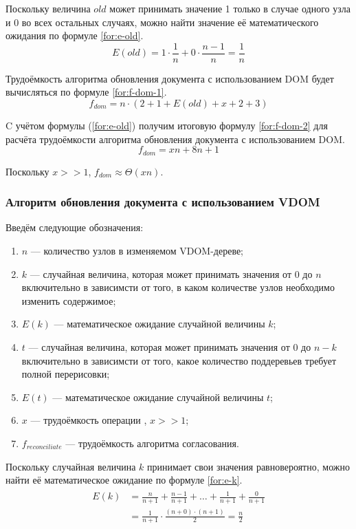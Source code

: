 Поскольку величина $old$ может принимать значение 1 только в случае одного узла и 0 во всех остальных случаях, можно найти значение её математического ожидания по формуле \ref{for:e-old}.
\begin{equation}
	\label{for:e-old}
	E(old) = 1 \cdot \frac{1}{n} + 0 \cdot \frac{n - 1}{n} = \frac{1}{n}
\end{equation}

Трудоёмкость алгоритма обновления документа с использованием DOM будет вычисляться по формуле \ref{for:f-dom-1}.
\begin{equation}
	\label{for:f-dom-1}
	f_{dom} = n \cdot (2 + 1 + E(old) + x + 2 + 3)
\end{equation}

C учётом формулы (\ref{for:e-old}) получим итоговую формулу \ref{for:f-dom-2} для расчёта трудоёмкости алгоритма обновления документа с использованием DOM.
\begin{equation}
	\label{for:f-dom-2}
	f_{dom} = xn + 8n + 1
\end{equation}

Поскольку $x >> 1$, $f_{dom} \approx \Theta(xn)$.

\subsubsection{Алгоритм обновления документа с использованием VDOM}
Введём следующие обозначения:
\begin{enumerate}[label=\arabic*)]
	\item $n$ --- количество узлов в изменяемом VDOM-дереве;
	\item $k$ --- случайная величина, которая может принимать значения от 0 до $n$ включительно в зависимсти от того, в каком количестве узлов необходимо изменить содержимое;
	\item $E(k)$ --- математическое ожидание случайной величины $k$;
	\item $t$ --- случайная величина, которая может принимать значения от 0 до $n - k$ включительно в зависимсти от того, какое количество поддеревьев требует полной перерисовки;
	\item $E(t)$ --- математическое ожидание случайной величины $t$;
	\item $x$ --- трудоёмкость операции , $x >> 1$;
	\item $f_{reconciliate}$ --- трудоёмкость алгоритма согласования.
\end{enumerate}

Поскольку случайная величина $k$ принимает свои значения равновероятно, можно найти её математическое ожидание по формуле \ref{for:e-k}.
\begin{align}
	\begin{split}
		\label{for:e-k}
		E(k) &= \frac{n}{n + 1} + \frac{n - 1}{n + 1}  + \dotsc + \frac{1}{n + 1} + \frac{0}{n + 1} \\
		&= \frac{1}{n + 1} \cdot \frac{(n + 0)\cdot(n + 1)}{2} = \frac{n}{2}
	\end{split}
\end{align}

